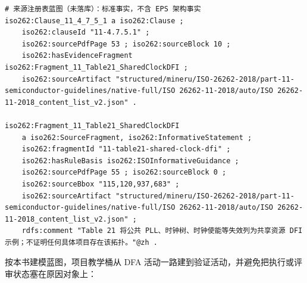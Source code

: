 \nopagebreak[4]
\begin{codebox}
\begin{Verbatim}[fontsize=\small,breaklines=true,breakanywhere=true,breaksymbolleft={},breaksymbolright={}]
# 来源注册表蓝图（未落库）：标准事实，不含 EPS 架构事实
iso262:Clause_11_4_7_5_1 a iso262:Clause ;
    iso262:clauseId "11-4.7.5.1" ;
    iso262:sourcePdfPage 53 ; iso262:sourceBlock 10 ;
    iso262:hasEvidenceFragment iso262:Fragment_11_Table21_SharedClockDFI ;
    iso262:sourceArtifact "structured/mineru/ISO-26262-2018/part-11-semiconductor-guidelines/native-full/ISO 26262-11-2018/auto/ISO 26262-11-2018_content_list_v2.json" .

iso262:Fragment_11_Table21_SharedClockDFI
    a iso262:SourceFragment, iso262:InformativeStatement ;
    iso262:fragmentId "11-table21-shared-clock-dfi" ;
    iso262:hasRuleBasis iso262:ISOInformativeGuidance ;
    iso262:sourcePdfPage 55 ; iso262:sourceBlock 0 ;
    iso262:sourceBbox "115,120,937,683" ;
    iso262:sourceArtifact "structured/mineru/ISO-26262-2018/part-11-semiconductor-guidelines/native-full/ISO 26262-11-2018/auto/ISO 26262-11-2018_content_list_v2.json" ;
    rdfs:comment "Table 21 将公共 PLL、时钟树、时钟使能等失效列为共享资源 DFI 示例；不证明任何具体项目存在该拓扑。"@zh .
\end{Verbatim}
\end{codebox}

按本书建模蓝图，项目教学桶从 DFA 活动一路建到验证活动，并避免把执行或评审状态塞在原因对象上：

